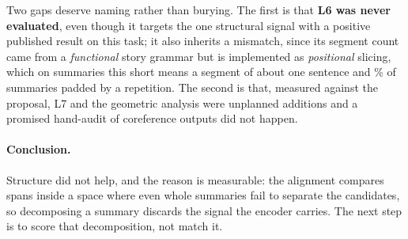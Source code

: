 \documentclass[11pt,letterpaper,twocolumn]{article}
\begin{document}
Two gaps deserve naming rather than burying. The first is that \textbf{L6 was
never evaluated}, even though it targets the one structural signal with a
positive published result on this task; it also inherits a mismatch, since its
segment count came from a \emph{functional} story grammar but is implemented as
\emph{positional} slicing, which on summaries this short means a segment of
about one sentence and \SegPadPct\% of summaries padded by a repetition. The
second is that, measured against the proposal, L7 and the geometric analysis
were unplanned additions and a promised hand-audit of coreference outputs did
not happen.

\paragraph{Conclusion.} Structure did not help, and the reason is measurable:
the alignment compares spans inside a space where even whole summaries fail to
separate the candidates, so decomposing a summary discards the signal the
encoder carries. The next step is to score that decomposition, not match it.

\clearpage


\end{document}
